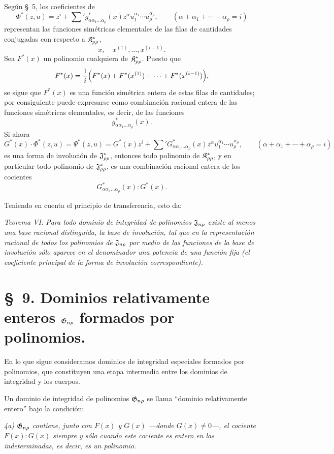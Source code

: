 \documentclass[11pt]{article}
\begin{document}
Según \S\ 5, los coeficientes de
\[
  \Phi^*(z,u)=z^i+\sum{}' g^*_{\alpha\alpha_1\ldots\alpha_\rho}(x)
  z^\alpha u_1^{\alpha_1}\cdots u_\rho^{\alpha_\rho},
  \qquad
  (\alpha+\alpha_1+\cdots+\alpha_\rho=i)
\]
representan las funciones simétricas elementales de las filas de cantidades conjugadas con respecto a $\mathfrak{K}^*_{\rho\rho}$,
\[
  x,\quad x^{(1)},\ldots,x^{(i-1)}.
\]
Sea $F^*(x)$ un polinomio cualquiera de $\mathfrak{K}^*_{\rho\rho}$. Puesto que
\[
  F^*(x)=\frac1i\Bigl(F^*(x)+F^*(x^{(1)})+
  \cdots+F^*(x^{(i-1)})\Bigr),
\]
se sigue que $F^*(x)$ es una función simétrica entera de estas filas de cantidades; por consiguiente puede expresarse como combinación racional entera de las funciones simétricas elementales, es decir, de las funciones
\[
  g^*_{\alpha\alpha_1\ldots\alpha_\rho}(x).
\]
Si ahora
\[
  G^*(x)\cdot\Phi^*(z,u)=\Psi^*(z,u)
  =G^*(x)z^i+
  \sum{}'G^*_{\alpha\alpha_1\ldots\alpha_\rho}(x)
  z^\alpha u_1^{\alpha_1}\cdots u_\rho^{\alpha_\rho},
  \qquad
  (\alpha+\alpha_1+\cdots+\alpha_\rho=i)
\]
es una forma de involución de $\mathfrak{J}^*_{\rho\rho}$, entonces todo polinomio de $\mathfrak{K}^*_{\rho\rho}$, y en particular todo polinomio de $\mathfrak{J}^*_{\rho\rho}$, es una combinación racional entera de los cocientes
\[
  G^*_{\alpha\alpha_1\ldots\alpha_\rho}(x):G^*(x).
\]

Teniendo en cuenta el principio de transferencia, esto da:

\emph{Teorema VI: Para todo dominio de integridad de polinomios $\mathfrak{J}_{n\rho}$ existe al menos una base racional distinguida, la base de involución, tal que en la representación racional de todos los polinomios de $\mathfrak{J}_{n\rho}$ por medio de las funciones de la base de involución sólo aparece en el denominador una potencia de una función fija (el coeficiente principal de la forma de involución correspondiente).}

\section*{\S\ 9. Dominios relativamente enteros $\mathfrak{G}_{n\rho}$ formados por polinomios.}

En lo que sigue consideramos dominios de integridad especiales formados por polinomios, que constituyen una etapa intermedia entre los dominios de integridad y los cuerpos.

Un dominio de integridad de polinomios $\mathfrak{G}_{n\rho}$ se llama ``dominio relativamente entero'' bajo la condición:

\emph{4a) $\mathfrak{G}_{n\rho}$ contiene, junto con $F(x)$ y $G(x)$ ---donde $G(x)\ne0$---, el cociente $F(x):G(x)$ siempre y sólo cuando este cociente es entero en las indeterminadas, es decir, es un polinomio.}
\end{document}
